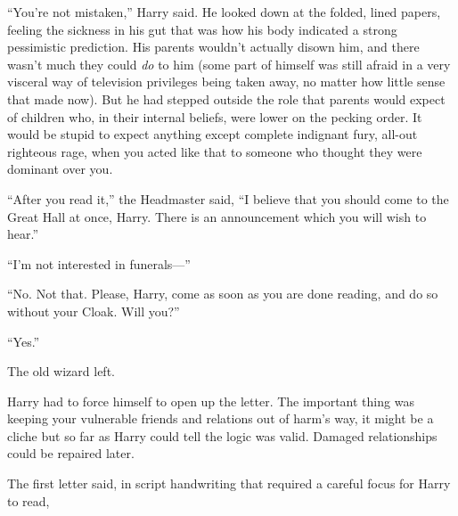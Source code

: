 “You’re not mistaken,” Harry said. He looked down at the folded, lined papers, feeling the sickness in his gut that was how his body indicated a strong pessimistic prediction. His parents wouldn’t actually disown him, and there wasn’t much they could \emph{do} to him (some part of himself was still afraid in a very visceral way of television privileges being taken away, no matter how little sense that made now). But he had stepped outside the role that parents would expect of children who, in their internal beliefs, were lower on the pecking order. It would be stupid to expect anything except complete indignant fury, all-out righteous rage, when you acted like that to someone who thought they were dominant over you.

“After you read it,” the Headmaster said,
“I believe that you should come to the Great Hall at once, Harry. There is an announcement which you will wish to hear.”

“I’m not interested in funerals—”

“No. Not that. Please, Harry, come as soon as you are done reading, and do so without your Cloak. Will you?”

“Yes.”

The old wizard left.

Harry had to force himself to open up the letter. The important thing was keeping your vulnerable friends and relations out of harm’s way, it might be a cliche but so far as Harry could tell the logic was valid. Damaged relationships could be repaired later.

The first letter said, in script handwriting that required a careful focus for Harry to read,


